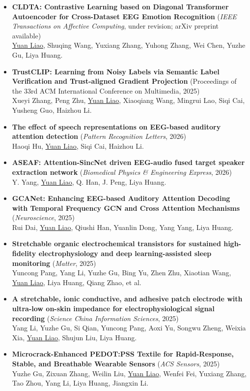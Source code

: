 \documentclass[letterpaper,10pt]{article}
\newcommand{\publication}[3]{
	\item \small{
		\textbf{#1} #2\\
		#3
	}\vspace{-2pt}
}
\begin{document}
\begin{itemize}[leftmargin=0.15in]
		\publication
		{CLDTA: Contrastive Learning based on Diagonal Transformer Autoencoder for Cross-Dataset EEG Emotion Recognition}
		{(\textit{IEEE Transactions on Affective Computing}, under revision; arXiv preprint available)}
		{\underline{Yuan Liao}, Shuqing Wang, Yuxiang Zhang, Yuhong Zhang, Wei Chen, Yuzhe Gu, Liya Huang.}
		
		\publication
		{TrustCLIP: Learning from Noisy Labels via Semantic Label Verification and Trust-aligned Gradient Projection}
		{(Proceedings of the 33rd ACM International Conference on Multimedia, 2025)}
		{Xueyi Zhang, Peng Zhu, \underline{Yuan Liao}, Xiaoqiang Wang, Mingrui Lao, Siqi Cai, Yusheng Guo, Haizhou Li.}
		
		\publication
		{The effect of speech representations on EEG-based auditory attention detection}
		{(\textit{Pattern Recognition Letters}, 2026)}
		{Haoqi Hu, \underline{Yuan Liao}, Siqi Cai, Haizhou Li.}
		
		\publication
		{ASEAF: Attention-SincNet driven EEG-audio fused target speaker extraction network}
		{(\textit{Biomedical Physics \& Engineering Express}, 2026)}
		{Y. Yang, \underline{Yuan Liao}, Q. Han, J. Peng, Liya Huang.}
		
		\publication
		{GCANet: Enhancing EEG-based Auditory Attention Decoding with Temporal Frequency GCN and Cross Attention Mechanisms}
		{(\textit{Neuroscience}, 2025)}
		{Rui Dai, \underline{Yuan Liao}, Qiushi Han, Yuanlin Dong, Yang Yang, Liya Huang.}
		
		\publication
		{Stretchable organic electrochemical transistors for sustained high-fidelity electrophysiology and deep learning-assisted sleep monitoring}
		{(\textit{Matter}, 2025)}
		{Yuncong Pang, Yang Li, Yuzhe Gu, Bing Yu, Zhen Zhu, Xiaotian Wang, \underline{Yuan Liao}, Liya Huang, Qiang Zhao, et al.}
		
		\publication
		{A stretchable, ionic conductive, and adhesive patch electrode with ultra-low on-skin impedance for electrophysiological signal recording}
		{(\textit{Science China Information Sciences}, 2025)}
		{Yang Li, Yuzhe Gu, Si Qian, Yuncong Pang, Aoxi Yu, Songwu Zheng, Weixia Xia, \underline{Yuan Liao}, Shujun Liu, Liya Huang.}
		
		\publication
		{Microcrack-Enhanced PEDOT:PSS Textile for Rapid-Response, Stable, and Breathable Wearable Sensors}
		{(\textit{ACS Sensors}, 2025)}
		{Yuzhe Gu, Zixuan Zhang, Weilin Liu, \underline{Yuan Liao}, Wenfei Fei, Yuxiang Zhang, Tao Zhou, Yang Li, Liya Huang, Jiangxin Li.}
		

\end{itemize}
\end{document}
